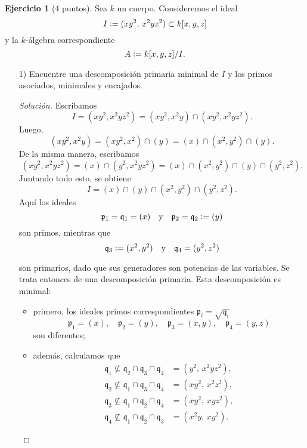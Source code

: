 \documentclass{article}
\theoremstyle{definition}
\newtheorem{ejerc}{Ejercicio}
\newenvironment{solucion}{\begin{proof}[Solución]}{\end{proof}}
\begin{document}
\begin{ejerc}[4 puntos]
  Sea $k$ un cuerpo. Consideremos el ideal
  $$I \mathrel{\mathop:}= (xy^2, \, x^2yz^2) \subset k [x,y,z]$$
  y la $k$-álgebra correspondiente
  $$A \mathrel{\mathop:}= k [x,y,z]/I.$$

  \begin{enumerate}
  \item[1)] Encuentre una descomposición primaria minimal de $I$ y los primos
    asociados, minimales y encajados.

    \ifdefined\solutions\begin{solucion}
      Escribamos
      $$I = (xy^2, x^2yz^2) = (xy^2, x^2y) \cap (xy^2, x^2yz^2).$$
      Luego,
      $$(xy^2, x^2y) = (xy^2, x^2) \cap (y) = (x) \cap (x^2,y^2) \cap (y).$$
      De la misma manera, escribamos
      \[ (xy^2, x^2yz^2) =
         (x) \cap (y^2, x^2yz^2) =
         (x) \cap (x^2, y^2) \cap (y) \cap (y^2, z^2). \]
      Juntando todo esto, se obtiene
      $$I = (x) \cap (y) \cap (x^2,y^2) \cap (y^2, z^2).$$
      Aquí los ideales
      \[ \mathfrak{p}_1 = \mathfrak{q}_1 = (x)
         \quad\text{y}\quad
         \mathfrak{p}_2 = \mathfrak{q}_2 \mathrel{\mathop:}= (y) \]
      son primos, mientras que
      \[ \mathfrak{q}_3 \mathrel{\mathop:}= (x^2,y^2)
         \quad\text{y}\quad
         \mathfrak{q}_4 = (y^2,z^2) \]

      son primarios, dado que sus generadores son potencias de las
      variables. Se trata entonces de una descomposición primaria. Esta
      descomposición es minimal:

      \begin{itemize}
      \item primero, los ideales primos correspondientes
        $\mathfrak{p}_i = \sqrt{\mathfrak{q}_i}$
        \[ \mathfrak{p}_1 = (x), \quad
           \mathfrak{p}_2 = (y), \quad
           \mathfrak{p}_3 = (x,y), \quad
           \mathfrak{p}_4 = (y,z) \]
        son diferentes;

      \item además, calculamos que
        \begin{align*}
          \mathfrak{q}_1 \not\subseteq \mathfrak{q}_2\cap\mathfrak{q}_3\cap\mathfrak{q}_4 & = (y^2, \, x^2 y z^2),\\
          \mathfrak{q}_2 \not\subseteq \mathfrak{q}_1\cap\mathfrak{q}_3\cap\mathfrak{q}_4 & = (xy^2, \, x^2 z^2),\\
          \mathfrak{q}_3 \not\subseteq \mathfrak{q}_1\cap\mathfrak{q}_2\cap\mathfrak{q}_4 & = (xy^2, \, xyz^2),\\
          \mathfrak{q}_4 \not\subseteq \mathfrak{q}_1\cap\mathfrak{q}_2\cap\mathfrak{q}_3 & = (x^2y, \, xy^2).
        \end{align*}
\end{itemize}


\end{solucion}
\end{enumerate}
\end{ejerc}
\end{document}
